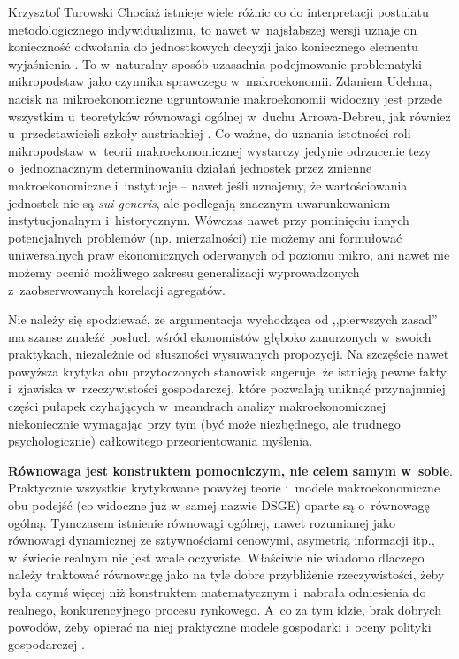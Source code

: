 \begin{artplenv}{Krzysztof Turowski}
Chociaż istnieje wiele różnic co do interpretacji postulatu metodologicznego indywidualizmu, to nawet w~najsłabszej
wersji uznaje on konieczność odwołania do jednostkowych decyzji jako koniecznego elementu wyjaśnienia
\parencite{udehn_methodological_2001}.
To w~naturalny sposób uzasadnia podejmowanie problematyki mikropodstaw jako
czynnika sprawczego w~makroekonomii. Zdaniem Udehna, nacisk na mikroekonomiczne ugruntowanie makroekonomii widoczny
jest przede wszystkim u~teoretyków równowagi ogólnej w~duchu Arrowa-Debreu, jak również u~przedstawicieli szkoły
austriackiej
\parencite{udehn_changing_2002}.
Co ważne, do uznania istotności roli mikropodstaw w~teorii
makroekonomicznej wystarczy jedynie odrzucenie tezy o~jednoznacznym determinowaniu działań jednostek przez zmienne
makroekonomiczne i~instytucje -- nawet jeśli uznajemy, że wartościowania jednostek nie są \textit{sui generis}, ale
podlegają znacznym uwarunkowaniom instytucjonalnym i~historycznym. Wówczas nawet przy pominięciu innych potencjalnych
problemów (np. mierzalności) nie możemy ani formułować uniwersalnych praw ekonomicznych oderwanych od poziomu mikro,
ani nawet nie możemy ocenić możliwego zakresu generalizacji wyprowadzonych z~zaobserwowanych korelacji agregatów.

Nie należy się spodziewać, że argumentacja wychodząca od ,,pierwszych zasad'' ma szanse znaleźć posłuch wśród ekonomistów
głęboko zanurzonych w~swoich praktykach, niezależnie od słuszności wysuwanych propozycji. Na szczęście nawet powyższa
krytyka obu przytoczonych stanowisk sugeruje, że istnieją pewne fakty i~zjawiska w~rzeczywistości gospodarczej, które
pozwalają uniknąć przynajmniej części pułapek czyhających w~meandrach analizy makroekonomicznej niekoniecznie wymagając
przy tym (być może niezbędnego, ale trudnego psychologicznie) całkowitego przeorientowania myślenia.

\textbf{Równowaga jest konstruktem pomocniczym, nie celem samym w~sobie}. Praktycznie wszystkie krytykowane powyżej
teorie i~modele makroekonomiczne obu podejść (co widoczne już w~samej nazwie DSGE) oparte są o~równowagę ogólną.
Tymczasem istnienie równowagi ogólnej, nawet rozumianej jako równowagi dynamicznej ze sztywnościami cenowymi, asymetrią
informacji itp., w~świecie realnym nie jest wcale oczywiste. Właściwie nie wiadomo dlaczego należy traktować równowagę
jako na tyle dobre przybliżenie rzeczywistości, żeby była czymś więcej niż konstruktem matematycznym i~nabrała
odniesienia do realnego, konkurencyjnego procesu rynkowego. A~co za tym idzie, brak dobrych powodów, żeby opierać na
niej praktyczne modele gospodarki i~oceny polityki gospodarczej
\parencite{blaug_formalist_2003_tur}.


\end{artplenv}
